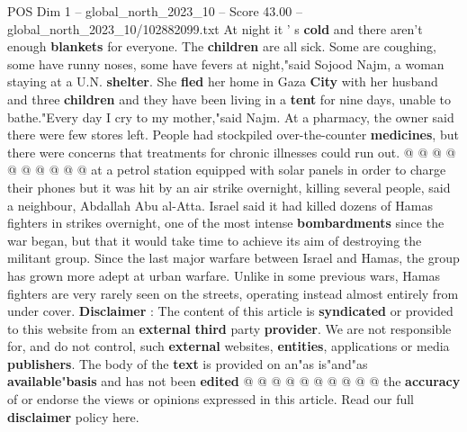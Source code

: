 \begin{textsample}{POS Dim 1 – global\_north\_2023\_10 – Score 43.00 – global\_north\_2023\_10/102882099.txt}
At night it ' s \textbf{cold} and there aren't enough \textbf{blankets} for everyone.
The \textbf{children} are all sick.
Some are coughing, some have runny noses, some have fevers at night,"said Sojood Najm, a woman staying at a U.N. \textbf{shelter}.
She \textbf{fled} her home in Gaza \textbf{City} with her husband and three \textbf{children} and they have been living in a \textbf{tent} for nine days, unable to bathe."Every day I cry to my mother,"said Najm.
At a pharmacy, the owner said there were few stores left.
People had stockpiled over-the-counter \textbf{medicines}, but there were concerns that treatments for chronic illnesses could run out. @ @ @ @ @ @ @ @ @ @ at a petrol station equipped with solar panels in order to charge their phones but it was hit by an air strike overnight, killing several people, said a neighbour, Abdallah Abu al-Atta.
Israel said it had killed dozens of Hamas fighters in strikes overnight, one of the most intense \textbf{bombardments} since the war began, but that it would take time to achieve its aim of destroying the militant group.
Since the last major warfare between Israel and Hamas, the group has grown more adept at urban warfare.
Unlike in some previous wars, Hamas fighters are very rarely seen on the streets, operating instead almost entirely from under cover. \textbf{Disclaimer} : The content of this article is \textbf{syndicated} or provided to this website from an \textbf{external} \textbf{third} party \textbf{provider}.
We are not responsible for, and do not control, such \textbf{external} websites, \textbf{entities}, applications or media \textbf{publishers}.
The body of the \textbf{text} is provided on an"as is"and"as \textbf{available}"\textbf{basis} and has not been \textbf{edited} @ @ @ @ @ @ @ @ @ @ the \textbf{accuracy} of or endorse the views or opinions expressed in this article.
Read our full \textbf{disclaimer} policy here.

\end{textsample}
